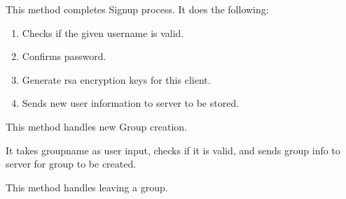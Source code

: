 \documentclass[letterpaper,10pt,english]{sphinxmanual}
\begin{document}
\begin{fulllineitems}
\begin{fulllineitems}
\begin{enumerate}
\end{enumerate}

\end{fulllineitems}


\begin{fulllineitems}
\label{\detokenize{clientHelper:clientHelper.Client.attemptSignup}}
This method completes Signup process.
It does the following:
\begin{enumerate}
\def\theenumi{\arabic{enumi}}
\def\labelenumi{\theenumi .}
\makeatletter\def\p@enumii{\p@enumi \theenumi .}\makeatother
\item {} 
Checks if the given username is valid.

\item {} 
Confirms password.

\item {} 
Generate rsa encryption keys for this client.

\item {} 
Sends new user information to server to be stored.

\end{enumerate}

\end{fulllineitems}


\begin{fulllineitems}
\label{\detokenize{clientHelper:clientHelper.Client.createGroup}}
This method handles new Group creation.

It takes groupname as user input, checks if it is valid, and sends group info to server for group to be created.

\end{fulllineitems}


\begin{fulllineitems}
\label{\detokenize{clientHelper:clientHelper.Client.leaveGroup}}
This method handles leaving a group.


\end{fulllineitems}
\end{fulllineitems}
\end{document}
